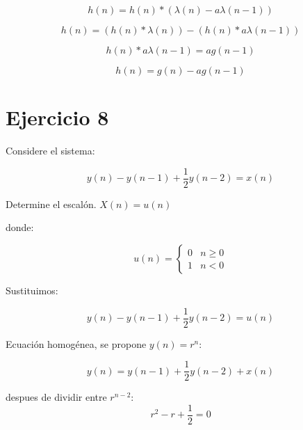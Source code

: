 \documentclass[12pt,a4paper]{article}
\begin{document}
\begin{equation}
h(n) = h(n) * (\lambda(n) - a \lambda(n-1))
\end{equation}

\begin{equation}
h(n) = (h(n) * \lambda(n)) - (h(n) * a \lambda(n-1))
\end{equation}

\begin{equation}
h(n) * a \lambda(n-1) = a g(n-1)
\end{equation}

\begin{equation}
\boxed{h(n) = g(n) - a g(n-1)}
\end{equation}

\section*{Ejercicio 8}

Considere el sistema:

\begin{equation}
y(n) - y(n-1) + \frac{1}{2} y(n-2) = x(n)
\end{equation}

Determine el escalón. $X(n) = u(n)$
\vspace{0.4cm}

donde:

\begin{equation}
u(n) = \begin{cases}
0 & n \geq 0 \\
1 & n < 0
\end{cases}
\end{equation}

Sustituimos:

\begin{equation}
y(n) - y(n-1) + \frac{1}{2} y(n-2) = u(n)
\end{equation}

Ecuación homogénea, se propone $y(n) = r^n$:

\begin{equation}
y(n) = y(n-1) + \frac{1}{2} y(n-2) + x(n)
\end{equation}
\vspace{0.4cm}

despues de dividir entre $r^{n-2}$:
\begin{equation}
r^2 - r + \frac{1}{2} = 0
\end{equation}
\vspace{0.4cm}
\end{document}
